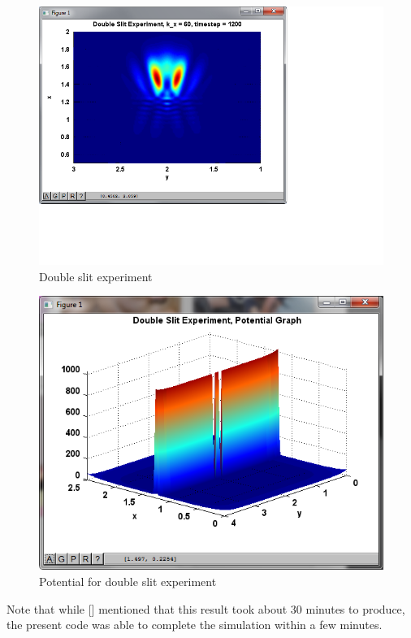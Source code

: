 \documentclass[letterpaper,12pt]{article}
\begin{document}
\begin{figure}[!htbp]
\centering
\includegraphics[scale=0.85,trim = 20mm 60mm 70mm 9mm,clip=true]{doubleslit1200.png}
\caption{Double slit experiment}
\label{fig:ds2}
\end{figure}

\begin{figure}[!htbp]
\centering
\includegraphics[scale=0.85,trim = 10mm 10mm 2mm 8mm,clip=true]{potential.png}
\caption{Potential for double slit experiment}
\label{fig:ds3}
\end{figure}

Note that while [] mentioned that this result took about 30 minutes to produce, the present code was able to complete the simulation within a few minutes.
\end{document}
